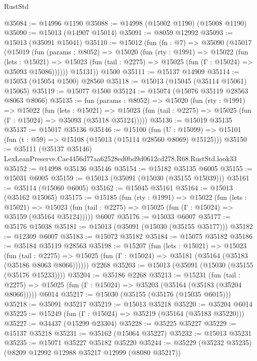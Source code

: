 \begin{lexlean}{RustStd}
\begin{coremodule}
@35084 := @14996 @1190
@35088 := @14998 (@15002 @1190) (@15008 @1190)
@35090 := @15013 (@14907 @15014)
@35091 := @8059 @12992
@35093 := @15013 (@35091 @15041)
@35110 := @15012
    (fun (fn : @7) =>
    @35090
      (@15017
        (@15019
          (fun (params : @8052) =>
          @15020
            (fun (rty : @1991) =>
            @15022
              (fun (lets : @15021) =>
              @15023 (fun (tail : @2275) => @15025 (fun (Γ : @15024) => @35093 @15086))))))
        @15131))
    @1500
@35111 := @15137 @14909
@35114 := @15053 (@15054 @1500) @28560
@35118 := @15013 (@15045 (@35114 @15061) @15065)
@35119 := @15077 @1500
@35124 := @15074 (@15076 @35119 @28563 @8063 @8066)
@35135 := fun (params : @8052) =>
  @15020
    (fun (rty : @1991) =>
    @15022
      (fun (lets : @15021) =>
      @15023 (fun (tail : @2275) => @15025 (fun (Γ : @15024) => @35093 (@35118 @35124)))))
@35136 := @15019 @35135
@35137 := @15017 @35136
@35146 := @15100
    (fun (U : @15099) => @15101 (fun (t : @59) => @15108 (@15013 (@15114 @28560 @8069) @15125)))
@35150 := @35111
    (@35137 @35146)
    LexLeanPreserve.Cae4456d77aa62528ed0bd9d0612cd278.R68.RustStd.look33
@35152 := @14998 @35136 @35146
@35154 := @15182 @35135 @6005
@35155 := @15031 @6005
@35159 := @15013 (@35091 (@15030 (@35155 @15039)))
@35161 := @35114 (@15060 @6005)
@35162 := @15045 @35161
@35164 := @15013 (@35162 @15065)
@35175 := @15185
    (fun (rty : @1991) =>
    @15022
      (fun (lets : @15021) =>
      @15023 (fun (tail : @2275) => @15025 (fun (Γ : @15024) => @35159 (@35164 @35124)))))
    @6007
@35176 := @15033 @6007
@35177 := @35176 @15038
@35181 := @15013 (@35091 (@15030 (@35155 @35177)))
@35182 := @12309 @6007
@35183 := @15072 @35182
@35184 := @15075 @35182
@35186 := @35184 @35119 @28563
@35198 := @15207
    (fun (lets : @15021) =>
    @15023
      (fun (tail : @2275) =>
      @15025 (fun (Γ : @15024) => @35181 (@35164 (@35183 (@35186 @8063 @8066))))))
    @2268
@35203 := @15013 (@35091 (@15030 (@35155 (@35176 @15233))))
@35204 := @35186 @2268
@35213 := @15231
    (fun (tail : @2275) => @15025 (fun (Γ : @15024) => @35203 (@35164 (@35183 (@35204 @8066)))))
    @6014
@35217 := @15030 (@35155 (@35176 (@15035 @6015)))
@35218 := @35091 @35217
@35219 := @15013 @35218
@35220 := @35204 @6014
@35225 := @15249 (fun (Γ : @15024) => @35219 (@35164 (@35183 @35220)))
@35227 := @34437 (@15299 @23304)
@35228 := @35225 @35227
@35229 := @15137 @35218
@35231 := @35162 (@15064 @35227)
@35232 := @15013 @35231
@35235 := @15071 @35227 @35182 @35220
@35244 := @35229 (@35232 @35235) (@8209 @12992 @12988 @35217 @12999 (@8080 @35217))

\end{coremodule}
\end{lexlean}
